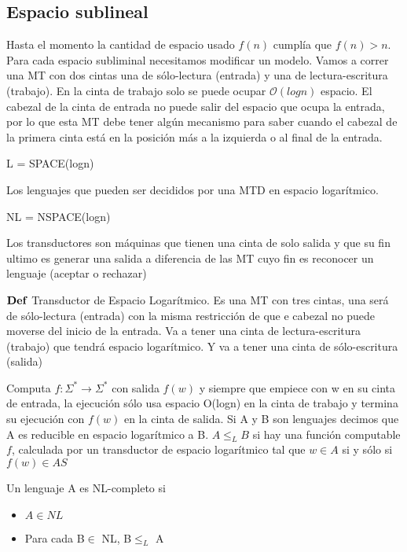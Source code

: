 \documentclass{homework}
\begin{document}
\subsection{Espacio sublineal}

Hasta el momento la cantidad de espacio usado $f(n)$ cumplía que $f(n) > n$. Para cada espacio subliminal necesitamos modificar un modelo. Vamos a correr una MT con dos cintas una de sólo-lectura (entrada) y una de lectura-escritura (trabajo). En la cinta de trabajo solo se puede ocupar $\mathcal{O}(logn)$ espacio. El cabezal de la cinta de entrada no puede salir del espacio que ocupa la entrada, por lo que esta MT debe tener algún mecanismo para saber cuando el cabezal de la primera cinta está en la posición más a la izquierda o al final de la entrada.

L = SPACE(logn)

Los lenguajes que pueden ser decididos por una MTD en espacio logarítmico.

NL = NSPACE(logn)

Los transductores son máquinas que tienen una cinta de solo salida y que su fin ultimo es generar una salida a diferencia de las MT cuyo fin es reconocer un lenguaje (aceptar o rechazar)

$\bf{Def}$ Transductor de Espacio Logarítmico.
Es una MT con tres cintas, una será de sólo-lectura (entrada) con la misma restricción de que e cabezal no puede moverse del inicio de la entrada.
Va a tener una cinta de lectura-escritura (trabajo) que tendrá espacio logarítmico.
Y va a tener una cinta de sólo-escritura (salida)

Computa $f:\Sigma^* \to \Sigma^*$ con salida $f(w)$ y siempre que empiece con w en su cinta de entrada, la ejecución sólo usa espacio O(logn) en la cinta de trabajo y termina su ejecución con $f(w)$ en la cinta de salida. Si A y B son lenguajes decimos que A es reducible en espacio logarítmico a B. $A \leq_{L} B$ si hay una función computable $f$, calculada por un transductor de espacio logarítmico tal que $w \in A$ si y sólo si $f(w) \in AS$

Un lenguaje A es NL-completo si
 \begin{itemize}
 	\item $A \in NL$
 	\item Para cada B$ \in$ NL, B$\leq_L$ A
 \end{itemize}
\end{document}
